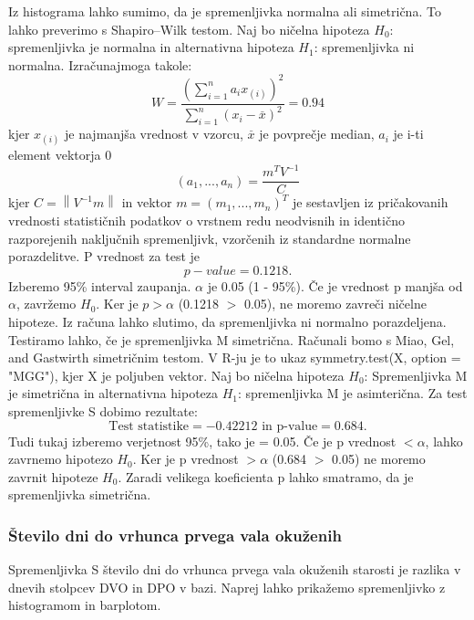 \documentclass[a4paper,11pt]{article}
\begin{document}
Iz histograma lahko sumimo, da je spremenljivka normalna ali simetrična. To lahko preverimo s Shapiro–Wilk testom. Naj bo ničelna hipoteza \(H_0\): spremenljivka je normalna in alternativna hipoteza \(H_1\): spremenljivka ni normalna. Izračunajmoga takole:
\[W = \frac{(\sum_{i = 1}^{n}a_i x_{(i)})^2}{\sum_{i = 1}^{n}(x_i - \overset{\_}{x})^2} = 0.94\]
kjer \(x_{(i)}\) je najmanjša vrednost v vzorcu, \(\overset{\_}{x}\) je povprečje median, \(a_i\) je i-ti element vektorja 0   
\[(a_1,...,a_n) = \frac{m^T V^{-1}}{C}\]
kjer \( C = \left\| V^{-1}m \right\|\) in vektor \(m = (m_1,...,m_n)^T\) je sestavljen iz pričakovanih vrednosti statističnih podatkov o vrstnem redu neodvisnih in identično razporejenih naključnih spremenljivk, vzorčenih iz standardne normalne porazdelitve. P vrednost za test je 
\[ p-value = 0.1218. \]
Izberemo 95\% interval zaupanja. \(\alpha\) je 0.05 (1 - 95\%). Če je vrednost p manjša od \(\alpha\), zavržemo \(H_0\). Ker je \(p > \alpha\) (0.1218 \(>\) 0.05), ne moremo zavreči ničelne hipoteze. Iz računa lahko slutimo, da spremenljivka ni normalno porazdeljena. Testiramo lahko, če je spremenljivka M simetrična. Računali bomo s Miao, Gel, and Gastwirth simetričnim testom. V R-ju je to ukaz symmetry.test(X, option = "MGG")\cite{lawstat}, kjer X je poljuben vektor. Naj bo ničelna hipoteza \(H_0\): Spremenljivka M je simetrična in alternativna hipoteza \(H_1\): spremenljivka M je asimterična. Za test spremenljivke S dobimo rezultate:
\[\text{Test statistike} = -0.42212 \text{ in p-value} =  0.684.\]
Tudi tukaj izberemo verjetnost 95\%, tako je \alpha = 0.05. Če je p vrednost \(< \alpha\), lahko zavrnemo hipotezo \(H_0\). Ker je p vrednost \(> \alpha\) (0.684 \(>\) 0.05) ne moremo zavrnit hipoteze \(H_0\). Zaradi velikega koeficienta p lahko smatramo, da je spremenljivka simetrična.


\subsubsection{Število dni do vrhunca prvega vala okuženih}
Spremenljivka S število dni do vrhunca prvega vala okuženih starosti je razlika v dnevih stolpcev DVO in DPO v bazi. Naprej lahko prikažemo spremenljivko z histogramom in barplotom. \\
\end{document}
